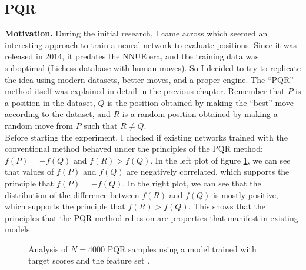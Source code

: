 \newpage
\subsection{PQR}

\textbf{Motivation.} During the initial research, I came across \cite{dlchess:2014} which seemed an interesting approach to train a neural network to evaluate positions. Since it was released in 2014, it predates the NNUE era, and the training data was suboptimal (Lichess database \cite{lichessdb} with human moves). So I decided to try to replicate the idea using modern datasets, better moves, and a proper engine. The \enquote{PQR} method itself was explained in detail in the previous chapter.  Remember that $P$ is a position in the dataset, $Q$ is the position obtained by making the \enquote{best} move according to the dataset, and $R$ is a random position obtained by making a random move from $P$ such that $R \neq Q$. \\

Before starting the experiment, I checked if existing networks trained with the conventional method behaved under the principles of the PQR method: ${f(P) = -f(Q)}$ and ${f(R) > f(Q)}$. In the left plot of figure \ref{pqr-eval}, we can see that values of $f(P)$ and $f(Q)$ are negatively correlated, which supports the principle that $f(P)=-f(Q)$. In the right plot, we can see that the distribution of the difference between $f(R)$ and $f(Q)$ is mostly positive, which supports the principle that $f(R) > f(Q)$. This shows that the principles that the PQR method relies on are properties that manifest in existing models.

\begin{figure}[H]
\centering
{}
\caption{Analysis of $N=4000$ PQR samples using a model trained with target scores and the feature set .}
\label{pqr-eval}
\end{figure}

